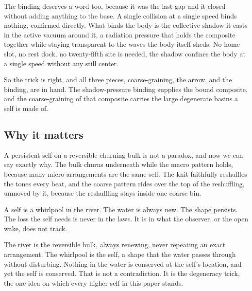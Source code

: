 The binding deserves a word too, because it was the last gap and it closed without adding anything to the base. A single collision at a single speed binds nothing, confirmed directly. What binds the body is the collective shadow it casts in the active vacuum around it, a radiation pressure that holds the composite together while staying transparent to the waves the body itself sheds. No home slot, no rest dock, no twenty-fifth site is needed, the shadow confines the body at a single speed without any still center.

So the trick is right, and all three pieces, coarse-graining, the arrow, and the binding, are in hand. The shadow-pressure binding supplies the bound composite, and the coarse-graining of that composite carries the large degenerate basins a self is made of.

\subsection{Why it matters}

A persistent self on a reversible churning bulk is not a paradox, and now we can say exactly why. The bulk churns underneath while the macro pattern holds, because many micro arrangements are the same self. The knit faithfully reshuffles the tones every beat, and the coarse pattern rides over the top of the reshuffling, unmoved by it, because the reshuffling stays inside one coarse bin.

\begin{principle}
A self is a whirlpool in the river. The water is always new. The shape persists. The loss the self needs is never in the laws. It is in what the observer, or the open wake, does not track.
\end{principle}

The river is the reversible bulk, always renewing, never repeating an exact arrangement. The whirlpool is the self, a shape that the water passes through without disturbing. Nothing in the water is conserved at the self's location, and yet the self is conserved. That is not a contradiction. It is the degeneracy trick, the one idea on which every higher self in this paper stands.
